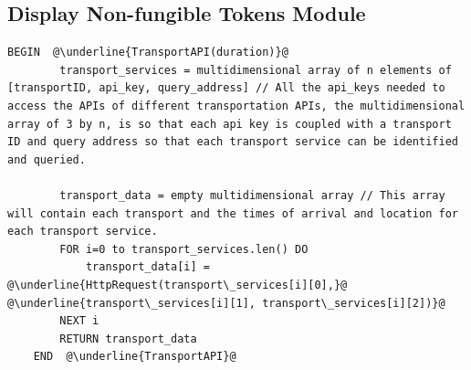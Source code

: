 \subsection{Display Non-fungible Tokens Module}

\begin{lstlisting}[caption= Interaction with Transport APIs, escapechar=\@]
	BEGIN  @\underline{TransportAPI(duration)}@
		transport_services = multidimensional array of n elements of [transportID, api_key, query_address] // All the api_keys needed to access the APIs of different transportation APIs, the multidimensional array of 3 by n, is so that each api key is coupled with a transport ID and query address so that each transport service can be identified and queried.

		transport_data = empty multidimensional array // This array will contain each transport and the times of arrival and location for each transport service.
		FOR i=0 to transport_services.len() DO
			transport_data[i] = @\underline{HttpRequest(transport\_services[i][0],}@ @\underline{transport\_services[i][1], transport\_services[i][2])}@ 
		NEXT i
		RETURN transport_data
	END  @\underline{TransportAPI}@
\end{lstlisting}


\vfill{}
